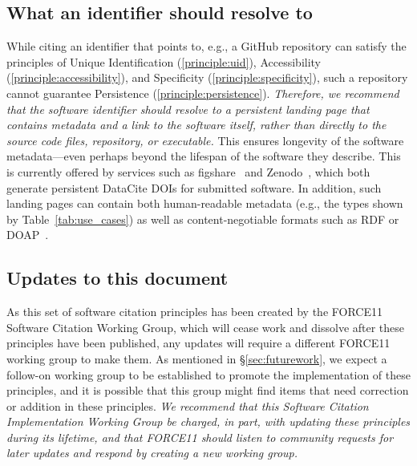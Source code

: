 \documentclass[12pt, oneside]{amsart}
\newcommand{\katznote}[1]{ {\textcolor{blue} { ***DSK: #1 }}} %
\newcommand{\LJHnote}[1]{ {\textcolor{fuschsia} { ***LJH: #1 }}} %
\begin{document}
\subsection{What an identifier should resolve to}

While citing an identifier that points to, e.g., a GitHub repository can satisfy the principles of Unique Identification (\ref{principle:uid}), Accessibility (\ref{principle:accessibility}), and Specificity (\ref{principle:specificity}), such a repository cannot guarantee Persistence (\ref{principle:persistence}).
\textit{Therefore, we recommend that the software identifier should resolve to a persistent landing page that contains metadata and a link to the software itself, rather than directly to the source code files, repository, or executable.}
This ensures longevity of the software metadata---even perhaps beyond the lifespan of the software they describe.
This is currently offered by services such as figshare~\cite{figshare} and Zenodo~\cite{github-citable-code-guide}, which both generate persistent DataCite DOIs for submitted software.
In addition, such landing pages can contain both human-readable metadata (e.g., the types shown by Table~\ref{tab:use_cases}) as well as content-negotiable formats such as RDF or DOAP~\cite{DOAP}.


%

\subsection{Updates to this document}

As this set of software citation principles has been created by the FORCE11 Software Citation Working Group, which will cease work and dissolve after these principles have been published,
any updates will require a different FORCE11 working group to make them.
As mentioned in \S\ref{sec:futurework}, we expect a follow-on working group to be established to promote the implementation of
these principles, and it is possible that this group might find items that need correction or addition
in these principles.
\textit{We recommend that this Software Citation Implementation Working Group be charged, in part,
with updating these principles during its lifetime, and that FORCE11 should listen to community requests for later updates and respond by creating a new working group.}
\end{document}
